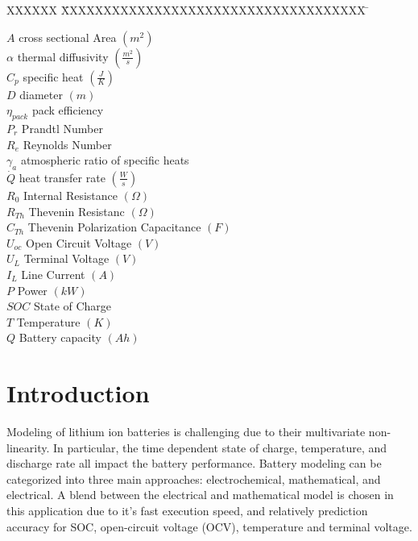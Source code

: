 \documentclass[]{aiaa-tc}%
\begin{document}
\begin{multicols}{2}
 \begin{tabbing}
  XXXXXX \= XXXXXXXXXXXXXXXXXXXXXXXXXXXXXXXXXXXX \= \kill %
  
  $A$ \> cross sectional Area $(m^{2})$ \\
  $\alpha$ \> thermal diffusivity $(\frac{m^{2}}{s})$\\
  $C_p$ \> specific heat $(\frac{J}{K})$\\
  $D$ \> diameter $(m)$\\
  $\eta_{pack}$ \> pack efficiency \\
  $P_{r}$ \> Prandtl Number \\
  $R_{e}$ \> Reynolds Number \\
  $\gamma_a$ \> atmospheric ratio of specific heats \\
  $\dot{Q}$ \> heat transfer rate $(\frac{W}{s})$ \\
  $R_{0}$ \> Internal Resistance $(\Omega)$ \\
  $R_{Th}$ \> Thevenin Resistanc $(\Omega)$ \\
  $C_{Th}$ \> Thevenin Polarization Capacitance $(F)$ \\
  $U_{oc}$ \> Open Circuit Voltage $(V)$ \\
  $U_{L}$ \> Terminal Voltage $(V)$ \\
  $I_{L}$ \> Line Current $(A)$ \\
  $P$ \> Power $(kW)$ \\
  $SOC$ \> State of Charge \\
  $T$ \> Temperature $(K)$\\
  $Q$\> Battery capacity $(Ah)$\\

 \end{tabbing}
\end{multicols}
\newpage


\section{Introduction}

Modeling of lithium ion batteries is challenging due to their multivariate non-linearity. In particular, the time dependent state of charge, temperature, and discharge rate all impact the battery performance. Battery modeling can be categorized into three main approaches: electrochemical, mathematical, and electrical. A blend between the electrical and mathematical model is chosen in this application due to it's fast execution speed, and relatively prediction accuracy for SOC, open-circuit voltage (OCV), temperature and terminal voltage.
\end{document}

